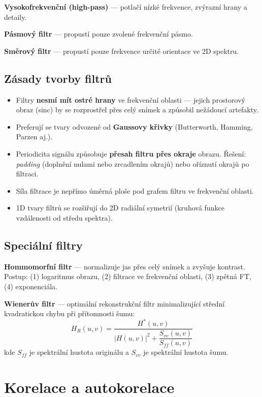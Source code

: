 \textbf{Vysokofrekvenční (high-pass)} — potlačí nízké frekvence, zvýrazní hrany a detaily.
 
\textbf{Pásmový filtr} — propustí pouze zvolené frekvenční pásmo.
 
\textbf{Směrový filtr} — propustí pouze frekvence určité orientace ve 2D spektru.
 
\subsection*{Zásady tvorby filtrů}
 
\begin{itemize}
  \item Filtry \textbf{nesmí mít ostré hrany} ve frekvenční oblasti — jejich prostorový obraz (sinc) by se rozprostřel přes celý snímek a způsobil nežádoucí artefakty.
  \item Preferují se tvary odvozené od \textbf{Gaussovy křivky} (Butterworth, Hamming, Parzen aj.).
  \item Periodicita signálu způsobuje \textbf{přesah filtru přes okraje} obrazu. Řešení: \emph{padding} (doplnění nulami nebo zrcadlením okrajů) nebo oříznutí okrajů po filtraci.
  \item Síla filtrace je nepřímo úměrná ploše pod grafem filtru ve frekvenční oblasti.
  \item 1D tvary filtrů se rozšiřují do 2D radiální symetrií (kruhová funkce vzdálenosti od středu spektra).
\end{itemize}
 
\subsection*{Speciální filtry}
 
\textbf{Hommomorfní filtr} — normalizuje jas přes celý snímek a zvyšuje kontrast. Postup: (1) logaritmus obrazu, (2) filtrace ve frekvenční oblasti, (3) zpětná FT, (4) exponenciála.
 
\textbf{Wienerův filtr} — optimální rekonstrukční filtr minimalizující střední kvadratickou chybu při přítomnosti šumu:
\[
  H_R(u,v) = \frac{H^*(u,v)}{|H(u,v)|^2 + \dfrac{S_{vv}(u,v)}{S_{ff}(u,v)}}
\]
kde $S_{ff}$ je spektrální hustota originálu a $S_{vv}$ je spektrální hustota šumu.
 
\section*{Korelace a autokorelace}
 
